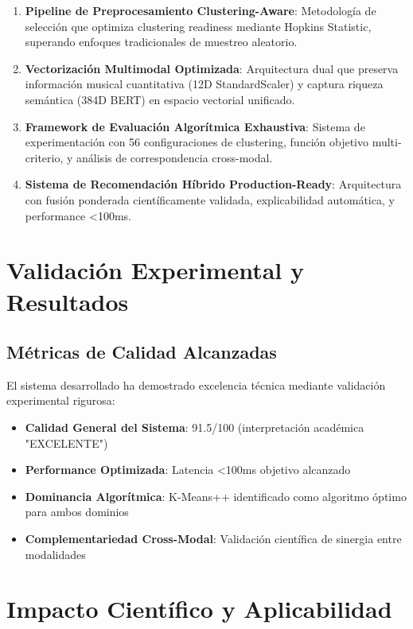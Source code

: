 \documentclass[12pt,a4paper]{report}
\begin{document}
\begin{enumerate}
\item \textbf{Pipeline de Preprocesamiento Clustering-Aware}: Metodología de selección que optimiza clustering readiness mediante Hopkins Statistic, superando enfoques tradicionales de muestreo aleatorio.

\item \textbf{Vectorización Multimodal Optimizada}: Arquitectura dual que preserva información musical cuantitativa (12D StandardScaler) y captura riqueza semántica (384D BERT) en espacio vectorial unificado.

\item \textbf{Framework de Evaluación Algorítmica Exhaustiva}: Sistema de experimentación con 56 configuraciones de clustering, función objetivo multi-criterio, y análisis de correspondencia cross-modal.

\item \textbf{Sistema de Recomendación Híbrido Production-Ready}: Arquitectura con fusión ponderada científicamente validada, explicabilidad automática, y performance <100ms.
\end{enumerate}

\section{Validación Experimental y Resultados}

\subsection{Métricas de Calidad Alcanzadas}

El sistema desarrollado ha demostrado excelencia técnica mediante validación experimental rigurosa:

\begin{itemize}
\item \textbf{Calidad General del Sistema}: 91.5/100 (interpretación académica "EXCELENTE")
\item \textbf{Performance Optimizada}: Latencia <100ms objetivo alcanzado
\item \textbf{Dominancia Algorítmica}: K-Means++ identificado como algoritmo óptimo para ambos dominios
\item \textbf{Complementariedad Cross-Modal}: Validación científica de sinergia entre modalidades
\end{itemize}

\section{Impacto Científico y Aplicabilidad}
\end{document}
